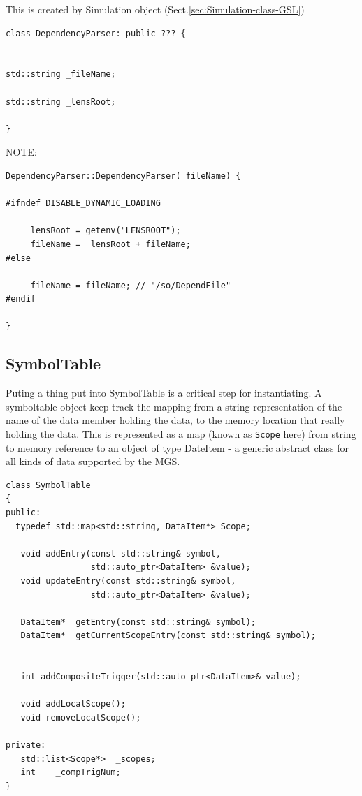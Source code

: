 This is created by Simulation object (Sect.\ref{sec:Simulation-class-GSL})

\begin{lstlisting}
class DependencyParser: public ??? {


std::string _fileName;

std::string _lensRoot;

}
\end{lstlisting}

NOTE:
\begin{lstlisting}
DependencyParser::DependencyParser( fileName) {

#ifndef DISABLE_DYNAMIC_LOADING

    _lensRoot = getenv("LENSROOT");
    _fileName = _lensRoot + fileName;
#else
    
    _fileName = fileName; // "/so/DependFile"
#endif

}
\end{lstlisting}


\subsection{SymbolTable}
\label{sec:SymbolTable}

Puting a thing put into SymbolTable is a critical step for instantiating.
A symboltable object keep track the mapping from a string representation of the
name of the data member holding the data, to the memory location that really
holding the data. This is represented as a map (known as \verb!Scope! here) from
string to memory reference to an object of type DateItem - a generic abstract
class for all kinds of data supported by the MGS.


\begin{verbatim}
class SymbolTable
{
public:
  typedef std::map<std::string, DataItem*> Scope;

   void addEntry(const std::string& symbol,
                 std::auto_ptr<DataItem> &value);
   void updateEntry(const std::string& symbol,
                 std::auto_ptr<DataItem> &value);
   
   DataItem*  getEntry(const std::string& symbol);
   DataItem*  getCurrentScopeEntry(const std::string& symbol);
   
   
   int addCompositeTrigger(std::auto_ptr<DataItem>& value);
   
   void addLocalScope();
   void removeLocalScope();

private:
   std::list<Scope*>  _scopes;
   int    _compTrigNum;
}
\end{verbatim}




